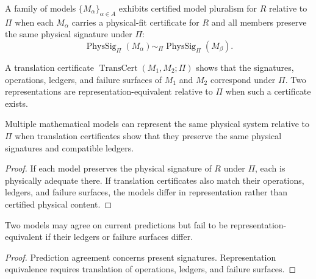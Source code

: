 \begin{definition}
\label{def:certified-model-pluralism}
A family of models $\{M_\alpha\}_{\alpha\in A}$ exhibits certified model pluralism for $R$ relative to $\Pi$ when each $M_\alpha$ carries a physical-fit certificate for $R$ and all members preserve the same physical signature under $\Pi$:
$$
\operatorname{PhysSig}_{\Pi}(M_\alpha)
\sim_{\Pi}
\operatorname{PhysSig}_{\Pi}(M_\beta).
$$
\end{definition}

\begin{definition}
\label{def:translation-certificate-representation-equivalence}
A translation certificate $\operatorname{TransCert}(M_1,M_2;\Pi)$ shows that the signatures, operations, ledgers, and failure surfaces of $M_1$ and $M_2$ correspond under $\Pi$. Two representations are representation-equivalent relative to $\Pi$ when such a certificate exists.
\end{definition}

\begin{theorem}
\label{thm:model-pluralism-translation-certificates}
Multiple mathematical models can represent the same physical system relative to $\Pi$ when translation certificates show that they preserve the same physical signatures and compatible ledgers.
\end{theorem}

\begin{proof}
If each model preserves the physical signature of $R$ under $\Pi$, each is physically adequate there. If translation certificates also match their operations, ledgers, and failure surfaces, the models differ in representation rather than certified physical content.
\end{proof}

\begin{corollary}
\label{cor:prediction-agreement-not-representation-equivalence}
Two models may agree on current predictions but fail to be representation-equivalent if their ledgers or failure surfaces differ.
\end{corollary}

\begin{proof}
Prediction agreement concerns present signatures. Representation equivalence requires translation of operations, ledgers, and failure surfaces.
\end{proof}

